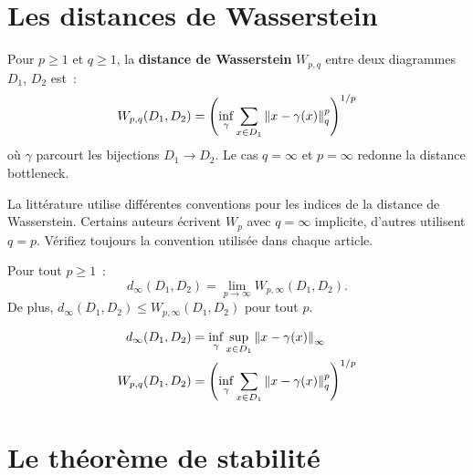 \section{Les distances de Wasserstein}
\label{sec:wasserstein}

\begin{definition}
\label{def:wasserstein}
Pour $p \geq 1$ et $q \geq 1$, la \textbf{distance de Wasserstein}
$W_{p,q}$ entre deux diagrammes $D_1$, $D_2$ est~:
\[
  W_{p,q}(D_1, D_2) = \left(\inf_{\gamma}
    \sum_{x \in D_1} \left\| x - \gamma(x) \right\|_q^p\right)^{1/p}
\]
o\`u $\gamma$ parcourt les bijections $D_1 \to D_2$.
Le cas $q = \infty$ et $p = \infty$ redonne la distance bottleneck.
\end{definition}

\begin{attention}[title=\textbf{Conventions variables}]
La litt\'erature utilise diff\'erentes conventions pour les indices de
la distance de Wasserstein. Certains auteurs \'ecrivent $W_p$ avec
$q = \infty$ implicite, d'autres utilisent $q = p$. V\'erifiez
toujours la convention utilis\'ee dans chaque article.
\end{attention}

\begin{proposition}
Pour tout $p \geq 1$~:
\[
  d_\infty(D_1, D_2) = \lim_{p \to \infty} W_{p,\infty}(D_1, D_2).
\]
De plus, $d_\infty(D_1, D_2) \leq W_{p,\infty}(D_1, D_2)$ pour tout $p$.
\end{proposition}

\begin{formules}[title=\textbf{R\'esum\'e des distances}]
\begin{align}
  d_\infty(D_1, D_2) &= \inf_{\gamma} \sup_{x \in D_1}
    \left\| x - \gamma(x) \right\|_\infty \\
  W_{p,q}(D_1, D_2) &= \left(\inf_{\gamma}
    \sum_{x \in D_1} \left\| x - \gamma(x) \right\|_q^p\right)^{1/p}
\end{align}
\end{formules}

\section{Le th\'eor\`eme de stabilit\'e}
\label{sec:stabilite}

